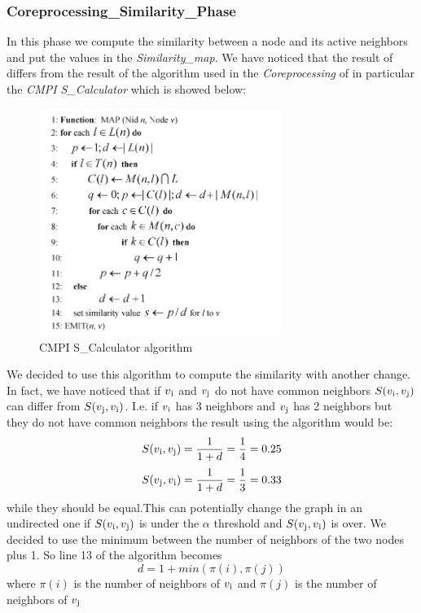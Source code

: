 \documentclass[12pt]{article}
\begin{document}
\subsubsection{Coreprocessing\_Similarity\_Phase}
In this phase we compute the similarity between a node and its active neighbors and put the values in the \emph{Similarity\_map}. We have noticed that the result of  differs from the result of the algorithm used in the \emph{Coreprocessing} of \cite{6517336} in particular the \emph{CMPI S\_Calculator} which is showed below:
     \begin{figure}[H]
       \centering
         \includegraphics[width=0.7\textwidth]{similarity-code.png}
       \caption{CMPI S\_Calculator algorithm}
       \label{fig:depold}
     \end{figure}
We decided to use this algorithm to compute the similarity with another change. In fact, we have noticed that
if $v\textsubscript{i}$ and $v\textsubscript{j}$ do not have common neighbors $S(v\textsubscript{i},v\textsubscript{j})$ can differ from  $S(v\textsubscript{j},v\textsubscript{i})$. I.e. if $v\textsubscript{i}$ has 3 neighbors and $v\textsubscript{j}$ has 2 neighbors but they do not have common neighbors the result using the algorithm would be:
\begin{equation}
  S(v\textsubscript{i},v\textsubscript{j}) = \frac{1}{1 + d} = \frac{1}{4} = 0.25
\end{equation}
\begin{equation}
  S(v\textsubscript{j},v\textsubscript{i}) = \frac{1}{1 + d} = \frac{1}{3} = 0.33
\end{equation}
while they should be equal.This can potentially change the graph in an undirected one if   $S(v\textsubscript{i},v\textsubscript{j})$ is under the $\alpha$ threshold and $S(v\textsubscript{j},v\textsubscript{i})$ is over.
We decided to use the minimum between the number of neighbors of the two nodes plus 1. So line 13 of the algorithm becomes
\begin{equation}
    d = 1 + min(\pi(i), \pi(j))
\end{equation}
where $\pi(i)$ is the number of neighbors of $v\textsubscript{i}$ and $\pi(j)$ is the number of neighbors of $v\textsubscript{j}$
\end{document}
